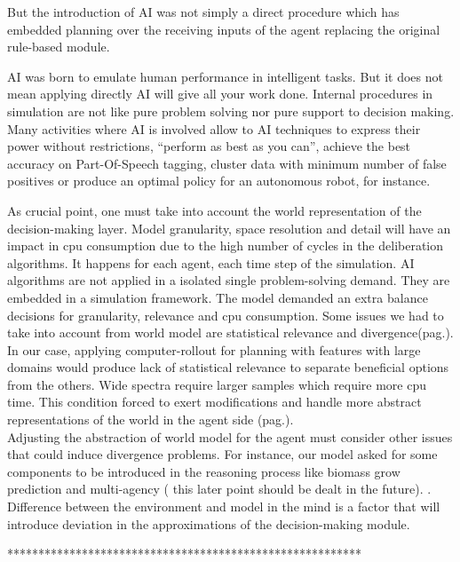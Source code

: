 \documentclass[11pt,oneside,a4paper,openright]{report}
\begin{document}
But the introduction of AI was not simply a direct procedure which has embedded planning over the receiving inputs of the agent replacing the original rule-based module.

AI was born to emulate human performance in intelligent tasks. But it does not mean applying directly AI will give all your work done. Internal procedures in simulation are not like pure problem solving nor pure support to decision making. Many activities where AI is involved allow to AI techniques to express their power without restrictions, ``perform as best as you can'', achieve the best accuracy on Part-Of-Speech tagging, cluster data with minimum number of false positives or produce an optimal policy for an autonomous robot, for instance. 

As crucial point, one must take into account the world representation of the decision-making layer. Model granularity, space resolution and detail will have an impact in cpu consumption due to the high number of cycles in the deliberation algorithms. It happens for each agent, each time step of the simulation. AI algorithms are not applied in a isolated single problem-solving demand. They are embedded in a simulation framework. The model demanded an extra balance decisions for granularity, relevance and cpu consumption.
Some issues we had to take into account from world model are statistical relevance and divergence(pag.\pageref{sec:Divergence}). In our case, applying computer-rollout for planning with features with large domains would produce lack of statistical relevance to separate beneficial options from the others. Wide spectra require larger samples which require more cpu time. This condition forced to exert modifications and handle more abstract representations of the world in the agent side 
(pag.\pageref{sec:ReduccStates}).\\
Adjusting the abstraction of world model for the agent must consider other issues that could induce divergence problems. For instance, our model asked for some components to be introduced in the reasoning process like biomass grow prediction and multi-agency ( this later point should be dealt in the future).
. Difference between the environment and model in the mind is a factor that will introduce deviation in the approximations of the decision-making module.


*********************************************************
\end{document}
